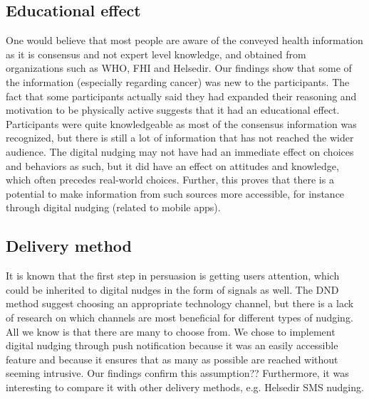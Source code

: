 \subsection{Educational effect}
One would believe that most people are aware of the conveyed health information as it is consensus and not expert level knowledge, and obtained from organizations such as WHO, FHI and Helsedir. Our findings show that some of the information (especially regarding cancer) was new to the participants. The fact that some participants actually said they had expanded their reasoning and motivation to be physically active suggests that it had an educational effect. Participants were quite knowledgeable as most of the consensus information was recognized, but there is still a lot of information that has not reached the wider audience. The digital nudging may not have had an immediate effect on choices and behaviors as such, but it did have an effect on attitudes and knowledge, which often precedes real-world choices. Further, this proves that there is a potential to make information from such sources more accessible, for instance through digital nudging (related to mobile apps). 


\subsection{Delivery method}
It is known that the first step in persuasion is getting users attention, which could be inherited to digital nudges in the form of signals as well. The DND method \cite{mirsch_making_2018} suggest choosing an appropriate technology channel, but there is a lack of research on which channels are most beneficial for different types of nudging.  All we know is that there are many to choose from. We chose to implement digital nudging through push notification because it was an easily accessible feature and because it ensures that as many as possible are reached without seeming intrusive. Our findings confirm this assumption?? Furthermore, it was interesting to compare it with other delivery methods, e.g. Helsedir SMS nudging. 

